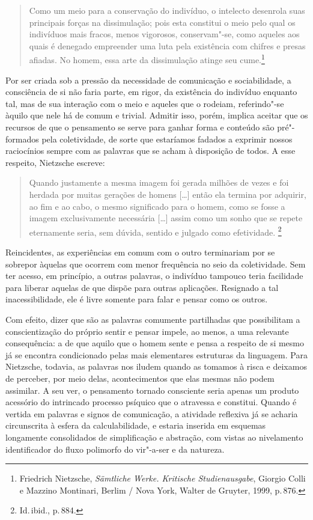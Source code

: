 \begin{quote}
Como um meio para a
conservação do indivíduo, o intelecto desenrola suas principais forças
na dissimulação; pois esta constitui o meio pelo qual os indivíduos
mais fracos, menos vigorosos, conservam"-se, como aqueles aos quais é
denegado empreender uma luta pela existência com chifres e presas
afiadas. No homem, essa arte da dissimulação atinge seu
cume.\footnote{ Friedrich Nietzsche, \textit{Sämtliche Werke.
Kritische Studienausgabe}, Giorgio Colli e Mazzino Montinari,
Berlim / Nova York, Walter de Gruyter, 1999, p.\,876.}
\end{quote}

Por ser criada sob a pressão da necessidade de comunicação e sociabilidade, a
consciência de si não faria parte, em rigor, da existência do indivíduo
enquanto tal, mas de sua interação com o meio e aqueles que o rodeiam,
referindo"-se àquilo que nele há de comum e trivial. Admitir isso, porém,
implica aceitar que os recursos de que o pensamento se serve para
ganhar forma e conteúdo são pré"-formados pela coletividade, de sorte
que estaríamos fadados a exprimir nossos raciocínios sempre com as
palavras que se acham à disposição de todos. A esse respeito, Nietzsche
escreve: 

\begin{quote}
Quando justamente a mesma imagem foi gerada milhões de vezes
e foi herdada por muitas gerações de homens [\ldots{}] então ela termina por
adquirir, ao fim e ao cabo, o mesmo significado para o homem, como se
fosse a imagem exclusivamente necessária [\dots] assim como um sonho que
se repete eternamente seria, sem dúvida, sentido e julgado como
efetividade. \footnote{ Id.\,ibid., p.\,884.} 
\end{quote}

Reincidentes,
as experiências em comum com o outro terminariam por se sobrepor
àquelas que ocorrem com menor frequência no seio da coletividade. Sem
ter acesso, em princípio, a outras palavras, o indivíduo tampouco
teria facilidade para liberar aquelas de que dispõe para outras
aplicações. Resignado a tal inacessibilidade, ele é livre somente
para falar e pensar como os outros.

Com efeito, dizer que são as palavras comumente partilhadas que
possibilitam a conscientização do próprio sentir e pensar impele,
ao menos, a uma relevante consequência: a de que aquilo que o homem
sente e pensa a respeito de si mesmo já se encontra
condicionado pelas mais elementares estruturas da linguagem. 
Para Nietzsche, todavia, as palavras nos iludem quando as
tomamos à risca e deixamos de perceber, por meio delas, acontecimentos
que elas mesmas não podem assimilar. A seu ver, o pensamento 
tornado consciente seria apenas um produto acessório do intrincado
processo psíquico que o atravessa e constitui. 
Quando é vertida em palavras e
signos de comunicação, a atividade reflexiva já se acharia circunscrita
à esfera da calculabilidade, e estaria inserida em esquemas longamente
consolidados de simplificação e abstração, com vistas ao nivelamento
identificador do fluxo polimorfo do vir"-a{}-ser e da natureza.

